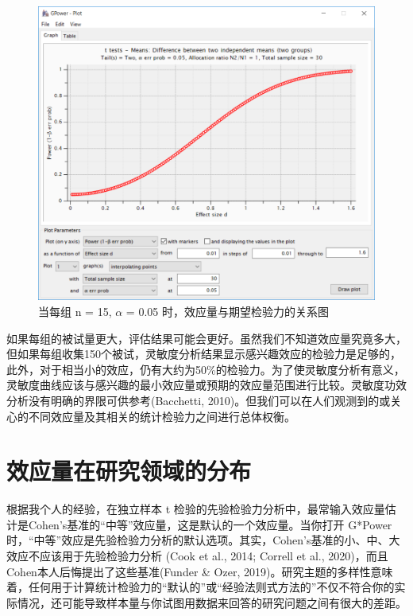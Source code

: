 \documentclass[
  letterpaper,
  DIV=11,
  numbers=noendperiod]{scrreprt}
\begin{document}
\begin{figure}

{\centering \includegraphics[width=1\textwidth,height=\textheight]{images/sensitivity1.png}

}

\caption{\label{fig-gsens1}当每组 n = 15, \(\alpha\) = 0.05
时，效应量与期望检验力的关系图}

\end{figure}

如果每组的被试量更大，评估结果可能会更好。虽然我们不知道效应量究竟多大，但如果每组收集150个被试，灵敏度分析结果显示感兴趣效应的检验力是足够的，此外，对于相当小的效应，仍有大约为50\%的检验力。为了使灵敏度分析有意义，灵敏度曲线应该与感兴趣的最小效应量或预期的效应量范围进行比较。灵敏度功效分析没有明确的界限可供参考(Bacchetti,
2010)。但我们可以在人们观测到的或关心的不同效应量及其相关的统计检验力之间进行总体权衡。

\hypertarget{ux6548ux5e94ux91cfux5728ux7814ux7a76ux9886ux57dfux7684ux5206ux5e03}{%
\section{效应量在研究领域的分布}\label{ux6548ux5e94ux91cfux5728ux7814ux7a76ux9886ux57dfux7684ux5206ux5e03}}

根据我个人的经验，在独立样本 t
检验的先验检验力分析中，最常输入效应量估计是Cohen's基准的``中等''效应量，这是默认的一个效应量。当你打开
G*Power
时，``中等''效应是先验检验力分析的默认选项。其实，Cohen's基准的小、中、大效应不应该用于先验检验力分析
(Cook et al., 2014; Correll et al.,
2020)，而且Cohen本人后悔提出了这些基准(Funder \& Ozer,
2019)。研究主题的多样性意味着，任何用于计算统计检验力的``默认的''或``经验法则式方法的''不仅不符合你的实际情况，还可能导致样本量与你试图用数据来回答的研究问题之间有很大的差距。
\end{document}
